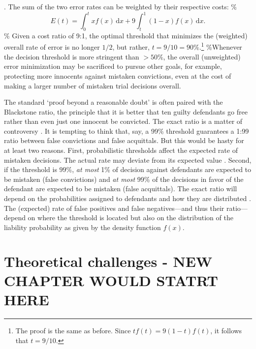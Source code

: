 \documentclass[10pt,dvipsnames,enabledeprecatedfontcommands]{scrartcl}
\begin{document}
\cite[but see][]{epps2015}. The sum of the two error rates can be
weighted by their respective costs: \%
\[E(t) = \int_0^t \! x f(x) \, \mathrm{d}x + 9\int_t^1 \! (1-x) f(x) \, \mathrm{d}x.
\] \% Given a cost ratio of 9:1, the optimal threshold that minimizes
the (weighted) overall rate of error is no longer \(1/2\), but rather,
\(t=9/10=90\%\).\footnote{The proof is the same as before. Since $tf(t)  = 9(1-t)f(t)$, it follows that 
$t  = 9/10$.} \%Whenever the decision threshold is more stringent than
\(>50\%\), the overall (unweighted) error minimization may be sacrificed
to pursue other goals, for example, protecting more innocents against
mistaken convictions, even at the cost of making a larger number of
mistaken trial decisions overall.

The standard `proof beyond a reasonable doubt' is often paired with the
Blackstone ratio, the principle that it is better that ten guilty
defendants go free rather than even just one innocent be convicted. The
exact ratio is a matter of controversy \citep{voloch1997}. It is
tempting to think that, say, a 99\% threshold guarantees a 1:99 ratio
between false convictions and false acquittals. But this would be hasty
for at least two reasons. First, probabilistic thresholds affect the
expected rate of mistaken decisions. The actual rate may deviate from
its expected value \citep{Kaye1999Clarifying-the-}. Second, if the
threshold is \(99\%\), \textit{at most} 1\% of decision against
defendants are expected to be mistaken (false convictions) and
\textit{at most} 99\% of the decisions in favor of the defendant are
expected to be mistaken (false acquittals). The exact ratio will depend
on the probabilities assigned to defendants and how they are distributed
\citep{allen2014}. The (expected) rate of false positives and false
negatives---and thus their ratio---depend on where the threshold is
located but also on the distribution of the liability probability as
given by the density function \(f(x)\).

\hypertarget{theoretical-challenges---new-chapter-would-statrt-here}{%
\section{Theoretical challenges - NEW CHAPTER WOULD STATRT
HERE}\label{theoretical-challenges---new-chapter-would-statrt-here}}
\end{document}
